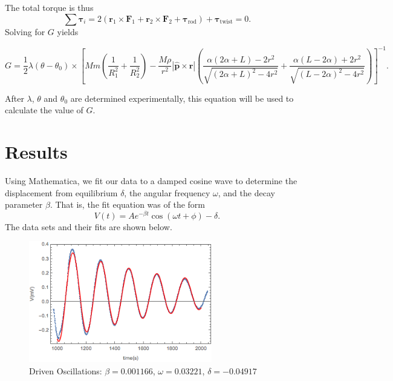 \documentclass[aps, reprint,amsmath,amssymb]{revtex4-1} %
\renewcommand{\vec}[1]{\boldsymbol{#1}}
\newcommand{\uv}[1]{\vec{\hat{#1}}}
\begin{document}
The total torque is thus
\[
    \sum \vec{\tau}_i = 2(\vec{r}_1 \times \vec{F}_1 + \vec{r}_2 \times
    \vec{F}_2 + \vec{\tau}_\text{rod}) + \vec{\tau}_\text{twist} = 0.
\]
Solving for $G$ yields
\begin{widetext}
\begin{equation}
    G = \frac{1}{2} \lambda (\theta - \theta_0)
    \times \left[
        Mm \left(\frac{1}{R_1^2} + \frac{1}{R_2^2}\right)
        - \frac{M \rho}{r^2}
        |\uv{p} \times \vec{r}| 
        \left(
        \frac{\alpha  (2 \alpha +L)-2 r^2}{\sqrt{(2 \alpha +L)^2-4
        r^2}}
        +\frac{\alpha  (L-2 \alpha ) + 2r^2}{\sqrt{(L-2 \alpha )^2-4
        r^2}}
        \right)
    \right]^{-1}.
    \label{eq:gravitational_constant}
\end{equation}
\end{widetext}
After $\lambda$, $\theta$ and $\theta_0$ are determined experimentally,
this equation will be used to calculate the value of $G$. 


\section{Results}

Using Mathematica, we fit our data to a damped cosine wave to determine the
displacement from equilibrium $\delta$, the angular frequency $\omega$, and
the decay parameter $\beta$. That is, the fit equation was of the form
\begin{equation} \label{eq:voltage_fit}
V(t) = A e^{-\beta t} \cos (\omega t + \phi) - \delta.
\end{equation}
The data sets and their fits are shown below.

\begin{figure}[b]
\centering
\includegraphics[width=8cm]{figs/drivenplot.png}
\caption{Driven Oscillations: $\beta = 0.001166$, $\omega = 0.03221$, $\delta=-0.04917$}
\label{fig:driven}
\end{figure}
\end{document}
